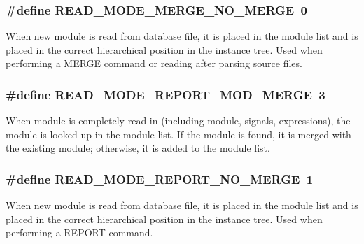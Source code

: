\subsubsection{\setlength{\rightskip}{0pt plus 5cm}\#define READ\_\-MODE\_\-MERGE\_\-NO\_\-MERGE\ 0}\label{group__read__modes_a0}


When new module is read from database file, it is placed in the module list and is placed in the correct hierarchical position in the instance tree. Used when performing a MERGE command or reading after parsing source files. 
\subsubsection{\setlength{\rightskip}{0pt plus 5cm}\#define READ\_\-MODE\_\-REPORT\_\-MOD\_\-MERGE\ 3}\label{group__read__modes_a3}


When module is completely read in (including module, signals, expressions), the module is looked up in the module list. If the module is found, it is merged with the existing module; otherwise, it is added to the module list. 
\subsubsection{\setlength{\rightskip}{0pt plus 5cm}\#define READ\_\-MODE\_\-REPORT\_\-NO\_\-MERGE\ 1}\label{group__read__modes_a1}


When new module is read from database file, it is placed in the module list and is placed in the correct hierarchical position in the instance tree. Used when performing a REPORT command. 